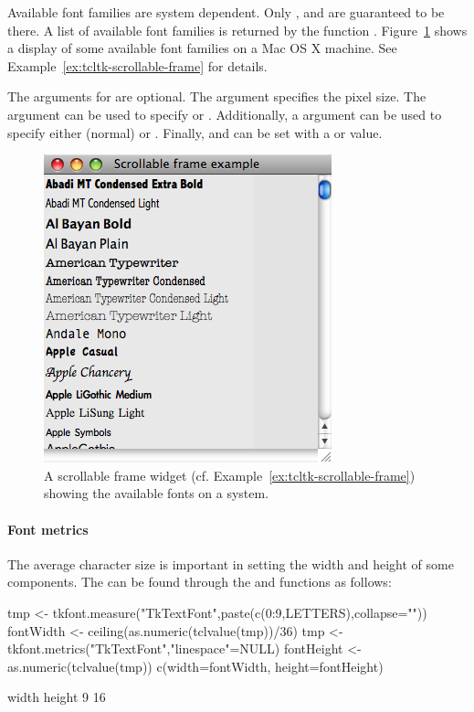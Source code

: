 Available font families are system dependent. Only ,  and
 are guaranteed to be there. A list of available
font families is returned by the function .
Figure~\ref{fig:fig-tcltk-all-fonts} shows a display of some available font families on a Mac
OS X machine.  See Example~\ref{ex:tcltk-scrollable-frame} for details.

The arguments for  are optional. The
 argument specifies the pixel size. The
 argument can be used to specify
 or .  Additionally, a
 argument can be used to specify either
 (normal) or . Finally,
 and
 can be set with a  or
 value.


\begin{figure}
  \centering
  \includegraphics[width=.4\textwidth]{fig-tcltk-all-fonts.png}
  \caption{A scrollable frame widget (cf. Example~\ref{ex:tcltk-scrollable-frame}) showing the available fonts on a system.}
  \label{fig:fig-tcltk-all-fonts}
\end{figure}


\paragraph{Font metrics}
The average character size is important in setting the width and height of some components. The can be found through the  and  functions as follows:
\begin{Schunk}
\begin{Sinput}
 tmp <- tkfont.measure("TkTextFont",paste(c(0:9,LETTERS),collapse=""))
 fontWidth <- ceiling(as.numeric(tclvalue(tmp))/36)
 tmp <- tkfont.metrics("TkTextFont","linespace"=NULL)
 fontHeight <- as.numeric(tclvalue(tmp))
 c(width=fontWidth, height=fontHeight)
\end{Sinput}
\begin{Soutput}
 width height 
     9     16 
\end{Soutput}
\end{Schunk}


